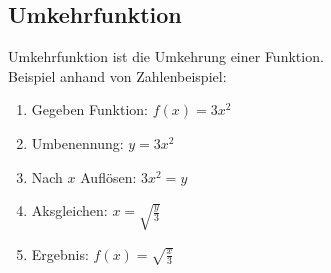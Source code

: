 \subsection{Umkehrfunktion}
Umkehrfunktion ist die Umkehrung einer Funktion. \\
Beispiel anhand von Zahlenbeispiel:
\begin{enumerate}
    \item Gegeben Funktion: $f(x) = 3x^2$
    \item Umbenennung: $y = 3x^2$
    \item Nach $x$ Auflösen: $3x^2 = y$
    \item Aksgleichen: $x = \sqrt{\frac{y}{3}}$
    \item Ergebnis: $f(x) = \sqrt{\frac{x}{3}}$
\end{enumerate}
